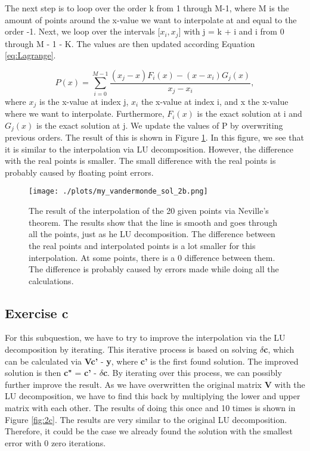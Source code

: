 The next step is to loop over the order k from 1 through M-1, where M is the amount of points around the x-value we want to interpolate at and equal to the order -1. Next, we loop over the intervals [$x_i, x_j$] with j = k + i and i from 0 through M - 1 - K. The values are then updated according Equation \ref{eq:Lagrange}.

\begin{equation}\label{Lagrange}
    P(x) = \sum^{M-1}_{i=0}{\frac{(x_j - x)F_i(x) - (x-x_i)G_j(x)}{x_j-x_i}},
\end{equation}
where $x_j$ is the x-value at index j, $x_i$ the x-value at index i, and x the x-value where we want to interpolate. Furthermore, $F_i(x)$ is the exact solution at i and $G_j(x)$ is the exact solution at j. We update the values of P by overwriting previous orders. The result of this is shown in Figure \ref{fig:2b}. In this figure, we see that it is similar to the interpolation via LU decomposition. However, the difference with the real points is smaller. The small difference with the real points is probably caused by floating point errors.

\begin{figure}[h!]
  \centering
  \texttt{[image: ./plots/my\_vandermonde\_sol\_2b.png]}
  \caption{The result of the interpolation of the 20 given points via Neville's theorem. The results show that the line is smooth and goes through all the points, just as he LU decomposition. The difference between the real points and interpolated points is a lot smaller for this interpolation. At some points, there is a 0 difference between them. The difference is probably caused by errors made while doing all the calculations.}
  \label{fig:2b}
\end{figure}

\subsection{Exercise c}
For this subquestion, we have to try to improve the interpolation via the LU decomposition by iterating. This iterative process is based on solving \textbf{$\delta$c}, which can be calculated via \textbf{Vc'} - \textbf{y}, where \textbf{c'} is the first found solution. The improved solution is then \textbf{c"} = \textbf{c'} - \textbf{$\delta$c}. By iterating over this process, we can possibly further improve the result. As we have overwritten the original matrix \textbf{V} with the LU decomposition, we have to find this back by multiplying the lower and upper matrix with each other. The results of doing this once and 10 times is shown in Figure \ref{fig:2c}. The results are very similar to the original LU decomposition. Therefore, it could be the case we already found the solution with the smallest error with 0 zero iterations.

